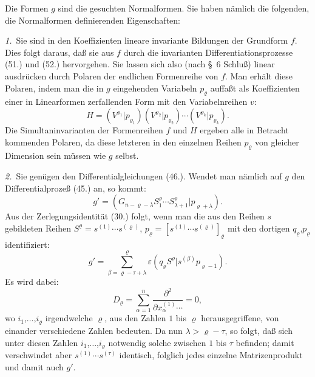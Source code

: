 \documentclass[12pt,a4paper]{article}
\begin{document}
Die Formen $g$ sind die gesuchten Normalformen. Sie haben nämlich die folgenden, die Normalformen definierenden Eigenschaften:

\textit{1.}\ Sie sind in den Koeffizienten lineare invariante Bildungen der Grundform $f$. Dies folgt daraus, daß sie aus $f$ durch die invarianten Differentiationsprozesse (51.) und (52.) hervorgehen. Sie lassen sich also (nach \S\ 6 Schluß) linear ausdrücken durch Polaren der endlichen Formenreihe von $f$. Man erhält diese Polaren, indem man die in $g$ eingehenden Variabeln $p_{\varrho}$ auffaßt als Koeffizienten einer in Linearformen zerfallenden Form mit den Variabelnreihen $v$:
\begin{equation*}
H = (V^{\varrho_{1}} | p_{\varrho_{1}}) (V^{\varrho_{2}} | p_{\varrho_{2}}) \cdots (V^{\varrho_{k}} | p_{\varrho_{k}}).
\end{equation*}
Die Simultaninvarianten der Formenreihen $f$ und $H$ ergeben alle in Betracht kommenden Polaren, da diese letzteren in den einzelnen Reihen $p_{\varrho}$ von gleicher Dimension sein müssen wie $g$ selbst.

\textit{2.}\ Sie genügen den Differentialgleichungen (46.). Wendet man nämlich auf $g$ den Differentialprozeß (45.) an, so kommt:
\begin{equation*}
g' = (G_{n-\varrho-\lambda} S^{\varrho}_{1} \cdots S^{\varrho}_{\lambda+1} | p_{\varrho+\lambda}).
\end{equation*}
Aus der Zerlegungsidentität (30.) folgt, wenn man die aus den Reihen $s$ gebildeten Reihen $S^{\varrho} = s^{(1)} \cdots s^{(\varrho)}$, $p_{\varrho} = [s^{(1)} \cdots s^{(\varrho)}]_{\varrho}$ mit den dortigen $q_{\varrho}$,$p_{\varrho}$ identifiziert:
\begin{equation*}
g' = \sum_{\beta=\varrho-\tau+\lambda}^{\varrho} \varepsilon (q_{\varrho} S^{\varrho} | s^{(\beta)} p_{\varrho-1}).
\end{equation*}
Es wird dabei:
\begin{equation*}
D_{\varrho} = \sum_{\alpha=1}^{n} \frac{\partial^{2}}{\partial x^{(1)}_{\alpha} \cdots} = 0,
\end{equation*}
wo $i_{1}$,$\ldots$,$i_{\varrho}$ irgendwelche $\varrho$, aus den Zahlen $1$ bis $\varrho$ herausgegriffene, von einander verschiedene Zahlen bedeuten. Da nun $\lambda > \varrho-\tau$, so folgt, daß sich unter diesen Zahlen $i_{1}$,$\ldots$,$i_{\varrho}$ notwendig solche zwischen $1$ bis $\tau$ befinden; damit verschwindet aber $s^{(1)} \cdots s^{(\tau)}$ identisch, folglich jedes einzelne Matrizenprodukt und damit auch $g'$.
\end{document}
